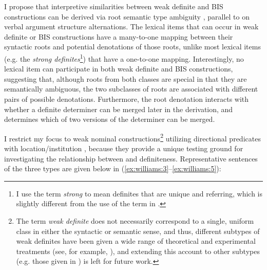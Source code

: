\documentclass[output=paper,
modfonts
]{langscibook}
\begin{document}
I propose that interpretive similarities between weak definite and BIS constructions can be derived via root semantic type ambiguity \citep[see][]{RappaportLevin1998}, parallel to \citet{Levinson2014} on verbal argument structure alternations. The lexical items that can occur in weak definite or BIS constructions have a many-to-one mapping between their syntactic roots and potential denotations of those roots, unlike most lexical items (e.g. the \textit{strong definites}\footnote{I use the term \textit{strong} to mean definites that are unique and referring, which is slightly different from the use of the term in \citet{Schwarz2009,Schwarz2013}.}) that have a one-to-one mapping. Interestingly, no lexical item can participate in both weak definite and BIS constructions, suggesting that, although roots from both classes are special in that they are semantically ambiguous, the two subclasses of roots are associated with different pairs of possible denotations. Furthermore, the root denotation interacts with whether a definite determiner can be merged later in the derivation, and determines which of two versions of the determiner can be merged.\newpage

I restrict my focus to weak nominal constructions\footnote{The term \textit{weak definite} does not necessarily correspond to a single, uniform class in either the syntactic or semantic sense, and thus, different subtypes of weak definites have been given a wide range of theoretical and experimental treatments (see, for example, \citealt{Barker2005,KleinEtAlii2009,Aguilar-GuevaraZwarsts2011,Klein2011,Aguilar-GuevaraSchulpen2014,Schwarz2014}), and extending this account to other subtypes (e.g. those given in \citealt{stvan1998}) is left for future work.} utilizing directional predicates with location/institution , because they provide a unique testing ground for investigating the relationship between  and definiteness. Representative sentences of the three types are given below in (\ref{ex:williams:3}--\ref{ex:williams:5}):

\begin{exe}
\end{exe}
\end{document}
